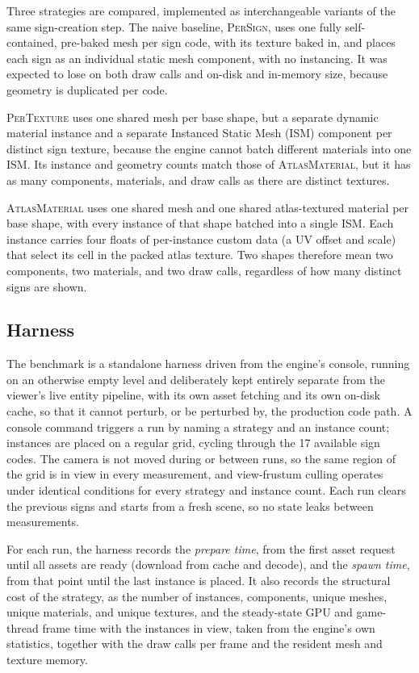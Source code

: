 Three strategies are compared, implemented as interchangeable variants of the same sign-creation step. The naive baseline, \textsc{PerSign}, uses one fully self-contained, pre-baked mesh per sign code, with its texture baked in, and places each sign as an individual static mesh component, with no instancing. It was expected to lose on both draw calls and on-disk and in-memory size, because geometry is duplicated per code.

\textsc{PerTexture} uses one shared mesh per base shape, but a separate dynamic material instance and a separate Instanced Static Mesh (ISM) component per distinct sign texture, because the engine cannot batch different materials into one ISM. Its instance and geometry counts match those of \textsc{AtlasMaterial}, but it has as many components, materials, and draw calls as there are distinct textures.

\textsc{AtlasMaterial} uses one shared mesh and one shared atlas-textured material per base shape, with every instance of that shape batched into a single ISM. Each instance carries four floats of per-instance custom data (a UV offset and scale) that select its cell in the packed atlas texture. Two shapes therefore mean two components, two materials, and two draw calls, regardless of how many distinct signs are shown.

\subsection{Harness}
\label{sec:eval-harness}

The benchmark is a standalone harness driven from the engine's console, running on an otherwise empty level and deliberately kept entirely separate from the viewer's live entity pipeline, with its own asset fetching and its own on-disk cache, so that it cannot perturb, or be perturbed by, the production code path. A console command triggers a run by naming a strategy and an instance count; instances are placed on a regular grid, cycling through the 17 available sign codes. The camera is not moved during or between runs, so the same region of the grid is in view in every measurement, and view-frustum culling operates under identical conditions for every strategy and instance count. Each run clears the previous signs and starts from a fresh scene, so no state leaks between measurements.

For each run, the harness records the \emph{prepare time}, from the first asset request until all assets are ready (download from cache and decode), and the \emph{spawn time}, from that point until the last instance is placed. It also records the structural cost of the strategy, as the number of instances, components, unique meshes, unique materials, and unique textures, and the steady-state GPU and game-thread frame time with the instances in view, taken from the engine's own statistics, together with the draw calls per frame and the resident mesh and texture memory.

